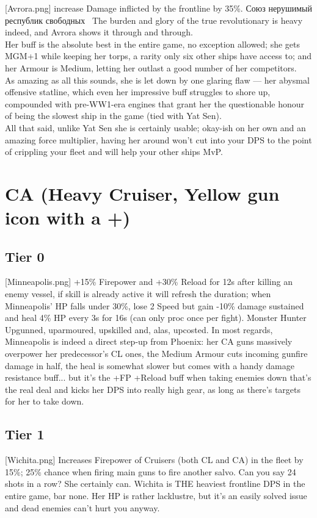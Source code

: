 [Avrora.png]
{increase Damage inflicted by the frontline by 35\%.}
{\foreignlanguage{russian}{Союз нерушимый республик свободных}~} %
{The burden and glory of the true revolutionary is heavy indeed, and Avrora shows it through and through.\\
Her buff is the absolute best in the entire game, no exception allowed; she gets MGM+1 while keeping her torps, a rarity only six other ships have access to; and her Armour is Medium, letting her outlast a good number of her competitors.\\
As amazing as all this sounds, she is let down by one glaring flaw --- her abysmal offensive statline, which even her impressive buff struggles to shore up, compounded with pre-WW1-era engines that grant her the questionable honour of being the slowest ship in the game (tied with Yat Sen).\\
All that said, unlike Yat Sen she is certainly usable; okay-ish on her own and an amazing force multiplier, having her around won't cut into your DPS to the point of crippling your fleet and will help your other ships MvP.\\}
 
 
\newpage
\section[CA]{CA (Heavy Cruiser, Yellow gun icon with a +)}
\subsection{Tier 0}
[Minneapolis.png]
{+15\% Firepower and +30\% Reload for 12s after killing an enemy vessel, if skill is already active it will refresh the duration; when Minneapolis' HP falls under 30\%, lose 2 Speed but gain -10\% damage sustained and heal 4\% HP every 3s for 16s (can only proc once per fight).}
{Monster Hunter}
{Upgunned, uparmoured, upskilled and, alas, upcosted. In most regards, Minneapolis is indeed a direct step-up from Phoenix: her CA guns massively overpower her predecessor's CL ones, the Medium Armour cuts incoming gunfire damage in half, the heal is somewhat slower but comes with a handy damage resistance buff... but it's the +FP +Reload buff when taking enemies down that's the real deal and kicks her DPS into really high gear, as long as there's targets for her to take down.}

 
\newpage
\subsection{Tier 1}
[Wichita.png]
{ Increases Firepower of Cruisers (both CL and CA) in the fleet by 15\%; 25\% chance when firing main guns to fire another salvo.}
{}
{Can you say 24 shots in a row? She certainly can. Wichita is THE heaviest frontline DPS in the entire game, bar none. Her HP is rather lacklustre, but it's an easily solved issue and dead enemies can't hurt you anyway.}
 
